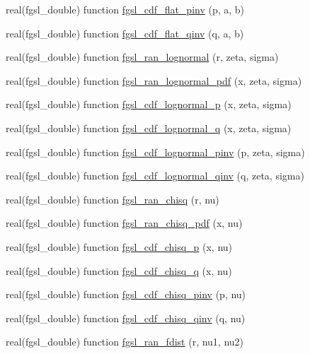 \begin{DoxyCompactItemize}
\item 
real(fgsl\+\_\+double) function \hyperlink{rng_8finc_a42e0a48e22b8aa4b734ccf0f520d6431}{fgsl\+\_\+cdf\+\_\+flat\+\_\+pinv} (p, a, b)
\item 
real(fgsl\+\_\+double) function \hyperlink{rng_8finc_a42ecda3cd6d30fdcb53b3b04e421638d}{fgsl\+\_\+cdf\+\_\+flat\+\_\+qinv} (q, a, b)
\item 
real(fgsl\+\_\+double) function \hyperlink{rng_8finc_a595430ab8b59586c367cc046a9f5debf}{fgsl\+\_\+ran\+\_\+lognormal} (r, zeta, sigma)
\item 
real(fgsl\+\_\+double) function \hyperlink{rng_8finc_a202090301f103185a3f44733bb1bcbd5}{fgsl\+\_\+ran\+\_\+lognormal\+\_\+pdf} (x, zeta, sigma)
\item 
real(fgsl\+\_\+double) function \hyperlink{rng_8finc_a5316890ad8197da791afcc5910bb509a}{fgsl\+\_\+cdf\+\_\+lognormal\+\_\+p} (x, zeta, sigma)
\item 
real(fgsl\+\_\+double) function \hyperlink{rng_8finc_a1f399bfba773e619deb9db2831e1f219}{fgsl\+\_\+cdf\+\_\+lognormal\+\_\+q} (x, zeta, sigma)
\item 
real(fgsl\+\_\+double) function \hyperlink{rng_8finc_aa342d9e7c0eca77722ad14b0ccb3b7d8}{fgsl\+\_\+cdf\+\_\+lognormal\+\_\+pinv} (p, zeta, sigma)
\item 
real(fgsl\+\_\+double) function \hyperlink{rng_8finc_a5e05ee3c7093525db7b13b1dc7f21090}{fgsl\+\_\+cdf\+\_\+lognormal\+\_\+qinv} (q, zeta, sigma)
\item 
real(fgsl\+\_\+double) function \hyperlink{rng_8finc_aafcd4ad23110cdf85cc02b3c17864d57}{fgsl\+\_\+ran\+\_\+chisq} (r, nu)
\item 
real(fgsl\+\_\+double) function \hyperlink{rng_8finc_a01f35dd8aa35ff85f20a6d59868013c4}{fgsl\+\_\+ran\+\_\+chisq\+\_\+pdf} (x, nu)
\item 
real(fgsl\+\_\+double) function \hyperlink{rng_8finc_a4e32d508a8eac8c4edb7d00bcbcda230}{fgsl\+\_\+cdf\+\_\+chisq\+\_\+p} (x, nu)
\item 
real(fgsl\+\_\+double) function \hyperlink{rng_8finc_aa75769eb52c32b5d6c8e769fab0be280}{fgsl\+\_\+cdf\+\_\+chisq\+\_\+q} (x, nu)
\item 
real(fgsl\+\_\+double) function \hyperlink{rng_8finc_a397d079779dd1ce60251527321d48b62}{fgsl\+\_\+cdf\+\_\+chisq\+\_\+pinv} (p, nu)
\item 
real(fgsl\+\_\+double) function \hyperlink{rng_8finc_a4a8a7e2add3fdabcea95ab881048af06}{fgsl\+\_\+cdf\+\_\+chisq\+\_\+qinv} (q, nu)
\item 
real(fgsl\+\_\+double) function \hyperlink{rng_8finc_acd433cb70a78cc54e2c4d02e3a7f9291}{fgsl\+\_\+ran\+\_\+fdist} (r, nu1, nu2)

\end{DoxyCompactItemize}
